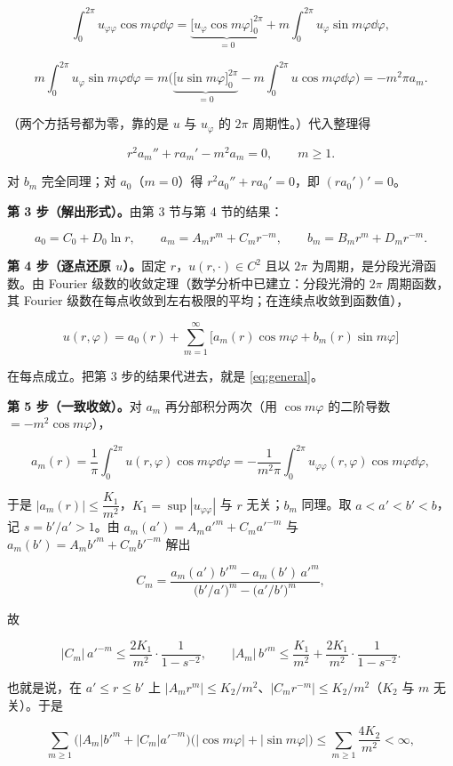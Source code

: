\[
\int_0^{2\pi}u_{\varphi\varphi}\cos m\varphi\dd\varphi
=\underbrace{\big[u_\varphi\cos m\varphi\big]_0^{2\pi}}_{=0}
+m\int_0^{2\pi}u_\varphi\sin m\varphi\dd\varphi,
\]

\[
m\int_0^{2\pi}u_\varphi\sin m\varphi\dd\varphi
=m\Big(\underbrace{\big[u\sin m\varphi\big]_0^{2\pi}}_{=0}-m\int_0^{2\pi}u\cos m\varphi\dd\varphi\Big)=-m^2\pi a_m .
\]

（两个方括号都为零，靠的是 $u$ 与 $u_\varphi$ 的 $2\pi$ 周期性。）代入整理得

\[
r^2a_m''+ra_m'-m^2a_m=0,\qquad m\ge1 .
\]

对 $b_m$ 完全同理；对 $a_0$（$m=0$）得 $r^2a_0''+ra_0'=0$，即 $(r a_0')'=0$。

\textbf{第 3 步（解出形式）。}由第 3 节与第 4 节的结果：

\[
a_0=C_0+D_0\ln r,\qquad
a_m=A_mr^m+C_mr^{-m},\qquad
b_m=B_mr^m+D_mr^{-m}.
\]

\textbf{第 4 步（逐点还原 $u$）。}固定 $r$，$u(r,\cdot)\in C^2$ 且以 $2\pi$ 为周期，是分段光滑函数。由 Fourier 级数的收敛定理（数学分析中已建立：分段光滑的 $2\pi$ 周期函数，其 Fourier 级数在每点收敛到左右极限的平均；在连续点收敛到函数值），

\[
u(r,\varphi)=a_0(r)+\sum_{m=1}^{\infty}\big[a_m(r)\cos m\varphi+b_m(r)\sin m\varphi\big]
\]

在每点成立。把第 3 步的结果代进去，就是 \eqref{eq:general}。

\textbf{第 5 步（一致收敛）。}对 $a_m$ 再分部积分两次（用 $\cos m\varphi$ 的二阶导数 $=-m^2\cos m\varphi$），

\[
a_m(r)=\frac1\pi\int_0^{2\pi}u(r,\varphi)\cos m\varphi\dd\varphi
=-\frac1{m^2\pi}\int_0^{2\pi}u_{\varphi\varphi}(r,\varphi)\cos m\varphi\dd\varphi ,
\]

于是 $|a_m(r)|\le\dfrac{K_1}{m^2}$，$K_1=\sup|u_{\varphi\varphi}|$ 与 $r$ 无关；$b_m$ 同理。取 $a<a'<b'<b$，记 $s=b'/a'>1$。由 $a_m(a')=A_ma'^m+C_ma'^{-m}$ 与 $a_m(b')=A_mb'^m+C_mb'^{-m}$ 解出

\[
C_m=\frac{a_m(a')\,b'^m-a_m(b')\,a'^m}{\big(b'/a'\big)^m-\big(a'/b'\big)^m},
\]

故

\[
|C_m|\,a'^{-m}\le\frac{2K_1}{m^2}\cdot\frac{1}{1-s^{-2}},\qquad
|A_m|\,b'^m\le\frac{K_1}{m^2}+\frac{2K_1}{m^2}\cdot\frac{1}{1-s^{-2}} .
\]

也就是说，在 $a'\le r\le b'$ 上 $|A_mr^m|\le K_2/m^2$、$|C_mr^{-m}|\le K_2/m^2$（$K_2$ 与 $m$ 无关）。于是

\[
\sum_{m\ge1}\Big(|A_m|b'^m+|C_m|a'^{-m}\Big)\big(|\cos m\varphi|+|\sin m\varphi|\big)
\le\sum_{m\ge1}\frac{4K_2}{m^2}<\infty ,
\]

